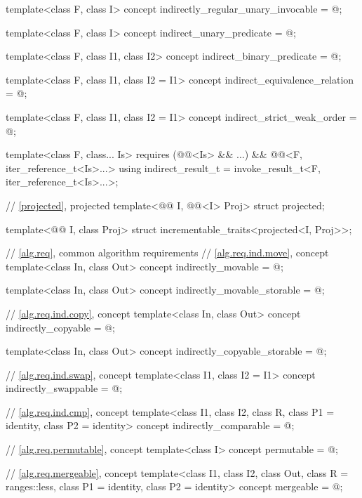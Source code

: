 \begin{codeblock}
{  template<class F, class I>
    concept indirectly_regular_unary_invocable = @\seebelow@;

  template<class F, class I>
    concept indirect_unary_predicate = @\seebelow@;

  template<class F, class I1, class I2>
    concept indirect_binary_predicate = @\seebelow@;

  template<class F, class I1, class I2 = I1>
    concept indirect_equivalence_relation = @\seebelow@;

  template<class F, class I1, class I2 = I1>
    concept indirect_strict_weak_order = @\seebelow@;

  template<class F, class... Is>
    requires (@@<Is> && ...) && @@<F, iter_reference_t<Is>...>
      using indirect_result_t = invoke_result_t<F, iter_reference_t<Is>...>;

  // \ref{projected}, projected
  template<@@ I, @@<I> Proj>
    struct projected;

  template<@@ I, class Proj>
    struct incrementable_traits<projected<I, Proj>>;

  // \ref{alg.req}, common algorithm requirements
  // \ref{alg.req.ind.move}, concept 
  template<class In, class Out>
    concept indirectly_movable = @\seebelow@;

  template<class In, class Out>
    concept indirectly_movable_storable = @\seebelow@;

  // \ref{alg.req.ind.copy}, concept 
  template<class In, class Out>
    concept indirectly_copyable = @\seebelow@;

  template<class In, class Out>
    concept indirectly_copyable_storable = @\seebelow@;

  // \ref{alg.req.ind.swap}, concept 
  template<class I1, class I2 = I1>
    concept indirectly_swappable = @\seebelow@;

  // \ref{alg.req.ind.cmp}, concept 
  template<class I1, class I2, class R, class P1 = identity, class P2 = identity>
    concept indirectly_comparable = @\seebelow@;

  // \ref{alg.req.permutable}, concept 
  template<class I>
    concept permutable = @\seebelow@;

  // \ref{alg.req.mergeable}, concept 
  template<class I1, class I2, class Out,
      class R = ranges::less, class P1 = identity, class P2 = identity>
    concept mergeable = @\seebelow@;

}
\end{codeblock}
